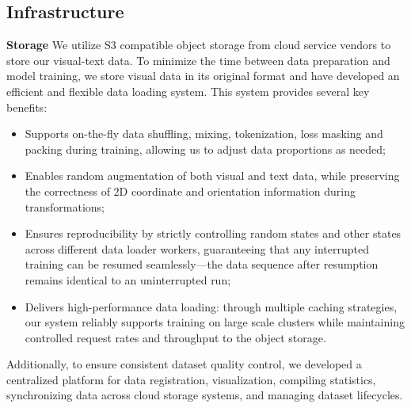 \documentclass{article}
\newcommand{\citep}[1]{\parencite{#1}}
\begin{document}
\subsection{Infrastructure}

\textbf{Storage}
We utilize S3 \citep{amazon_s3} compatible object storage from cloud service vendors to store our visual-text data.
To minimize the time between data preparation and model training, we store visual data in its original format and have developed an efficient and flexible data loading system.
This system provides several key benefits:
\begin{itemize}%
\item Supports on-the-fly data shuffling, mixing, tokenization, loss masking and packing during training, allowing us to adjust data proportions as needed;
\item Enables random augmentation of both visual and text data, while preserving the correctness of 2D coordinate and orientation information during transformations;
\item Ensures reproducibility by strictly controlling random states and other states across different data loader workers, guaranteeing that any interrupted training can be resumed seamlessly—the data sequence after resumption remains identical to an uninterrupted run;
\item Delivers high-performance data loading: through multiple caching strategies, our system reliably supports training on large scale clusters while maintaining controlled request rates and throughput to the object storage.
\end{itemize}
Additionally, to ensure consistent dataset quality control, we developed a centralized platform for data registration, visualization, compiling statistics, synchronizing data across cloud storage systems, and managing dataset lifecycles.
\end{document}
